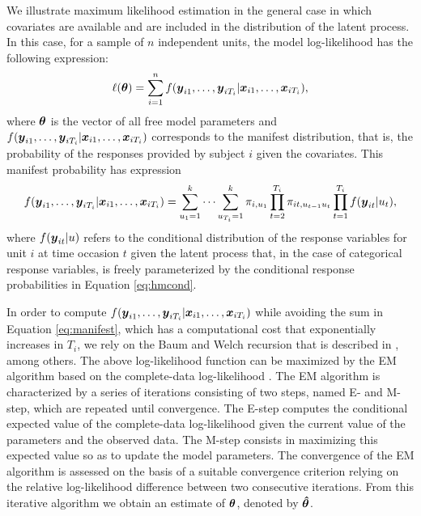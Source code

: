 We illustrate maximum likelihood estimation in the general case in which
covariates are available and are included in the distribution of the
latent process. In this case, for a sample of \(n\) independent units, the
model log-likelihood has the following expression: \[
\ell(\mbox{\boldmath $\theta$}) = \sum_{i=1}^n f(\mbox{\boldmath $y$}_{i1},\ldots,\mbox{\boldmath $y$}_{iT_i}|\mbox{\boldmath $x$}_{i1},\ldots,\mbox{\boldmath $x$}_{iT_i}),
\] where \(\mbox{\boldmath $\theta$}\) is the vector of all free model parameters and
\(f(\mbox{\boldmath $y$}_{i1},\ldots,\mbox{\boldmath $y$}_{iT_i}|\mbox{\boldmath $x$}_{i1},\ldots,\mbox{\boldmath $ x$}_{iT_i})\)
corresponds to the manifest distribution, that is, the probability of
the responses provided by subject \(i\) given the covariates. This
manifest probability has expression \begin{equation}
f(\mbox{\boldmath $y$}_{i1},\ldots,\mbox{\boldmath $y$}_{iT_i}|\mbox{\boldmath $x$}_{i1},\ldots,\mbox{\boldmath $x$}_{iT_i}) =  \sum_{u_1=1}^k\cdots\sum_{u_{T_i}=1}^k \pi_{i,u_1}
\prod_{t=2}^{T_i}\pi_{it,u_{t-1}u_t}
\prod_{t=1}^{T_i}f(\mbox{\boldmath $y$}_{it}|u_t),
\label{eq:manifest}
\end{equation} where \(f(\mbox{\boldmath $y$}_{it}|u)\) refers to the conditional
distribution of the response variables for unit \(i\) at time occasion
\(t\) given the latent process that, in the case of categorical response
variables, is freely parameterized by the conditional response
probabilities in Equation \eqref{eq:hmcond}.

In order to compute
\(f(\mbox{\boldmath $y$}_{i1},\ldots,\mbox{\boldmath $y$}_{iT_i}|\mbox{\boldmath $x$}_{i1},\ldots,\mbox{\boldmath $x$}_{iT_i})\) while
avoiding the sum in Equation \eqref{eq:manifest}, which has a
computational cost that exponentially increases in \(T_i\), we rely on the
Baum and Welch recursion \citep{baum:petr:66} that is described in
\cite{bart:farc:penn:13}, among others. The above log-likelihood function can be maximized by the EM algorithm based on the complete-data log-likelihood \citep{baum:et:al:70,demp:lair:rubi:77}. The EM algorithm is characterized by a series of
iterations consisting of two steps, named E- and M-step, which are
repeated until convergence. The E-step computes the conditional expected
value of the complete-data log-likelihood given the current value of the
parameters and the observed data. The M-step consists in maximizing this
expected value so as to update the model parameters. The convergence of
the EM algorithm is assessed on the basis of a suitable convergence
criterion relying on the relative log-likelihood difference between two
consecutive iterations. From this iterative algorithm we obtain an
estimate of \(\mbox{\boldmath $\theta$}\), denoted by \(\mbox{\boldmath $\hat{\theta}$}\).

